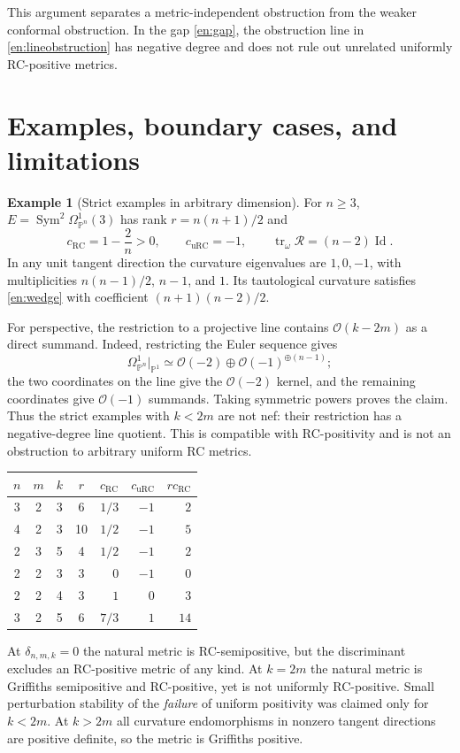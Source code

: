 \documentclass[12pt]{amsart}
\theoremstyle{definition}
\newtheorem{eg}[thm]{Example}
\theoremstyle{remark}
\numberwithin{equation}{section}
\DeclareMathOperator{\tr}{tr}
\DeclareMathOperator{\Id}{Id}
\DeclareMathOperator{\Sym}{Sym}
\newcommand{\urc}{\mathrm{uRC}}
\newcommand{\rc}{\mathrm{RC}}
\newcommand{\Pp}{\mathbb P}
\newcommand{\cst}{\delta_{n,m,k}}
\newcommand{\eref}[1]{\eqref{en:#1}}
\begin{document}
This argument separates a metric-independent obstruction from the weaker conformal obstruction. In the gap \eref{gap}, the obstruction line in \eref{lineobstruction} has negative degree and does not rule out unrelated uniformly RC-positive metrics.

\section{Examples, boundary cases, and limitations}

\begin{eg}[Strict examples in arbitrary dimension]\label{en:example}
For $n\ge3$, $E=\Sym^2\Omega^1_{\Pp^n}(3)$ has rank $r=n(n+1)/2$ and
\[
c_{\rc}=1-\frac2n>0,\qquad c_{\urc}=-1,\qquad
\tr_\omega\mathcal R=(n-2)\Id.
\]
In any unit tangent direction the curvature eigenvalues are $1,0,-1$, with multiplicities $n(n-1)/2$, $n-1$, and $1$. Its tautological curvature satisfies \eref{wedge} with coefficient $(n+1)(n-2)/2$.
\end{eg}

For perspective, the restriction to a projective line contains $\mathcal O(k-2m)$ as a direct summand. Indeed, restricting the Euler sequence gives
\[
\Omega^1_{\Pp^n}|_{\Pp^1}
\simeq\mathcal O(-2)\oplus\mathcal O(-1)^{\oplus(n-1)};
\]
the two coordinates on the line give the $\mathcal O(-2)$ kernel, and the remaining coordinates give $\mathcal O(-1)$ summands. Taking symmetric powers proves the claim. Thus the strict examples with $k<2m$ are not nef: their restriction has a negative-degree line quotient. This is compatible with RC-positivity and is not an obstruction to arbitrary uniform RC metrics.

\begin{center}
\begin{tabular}{@{}ccccrrr@{}}
\toprule
$n$&$m$&$k$&$r$&$c_{\rc}$&$c_{\urc}$&$r c_{\rc}$\\
\midrule
3&2&3&6&$1/3$&$-1$&$2$\\
4&2&3&10&$1/2$&$-1$&$5$\\
2&3&5&4&$1/2$&$-1$&$2$\\
2&2&3&3&$0$&$-1$&$0$\\
2&2&4&3&$1$&$0$&$3$\\
3&2&5&6&$7/3$&$1$&$14$\\
\bottomrule
\end{tabular}
\end{center}

At $\cst=0$ the natural metric is RC-semipositive, but the discriminant excludes an RC-positive metric of any kind. At $k=2m$ the natural metric is Griffiths semipositive and RC-positive, yet is not uniformly RC-positive. Small perturbation stability of the \emph{failure} of uniform positivity was claimed only for $k<2m$. At $k>2m$ all curvature endomorphisms in nonzero tangent directions are positive definite, so the metric is Griffiths positive.
\end{document}
